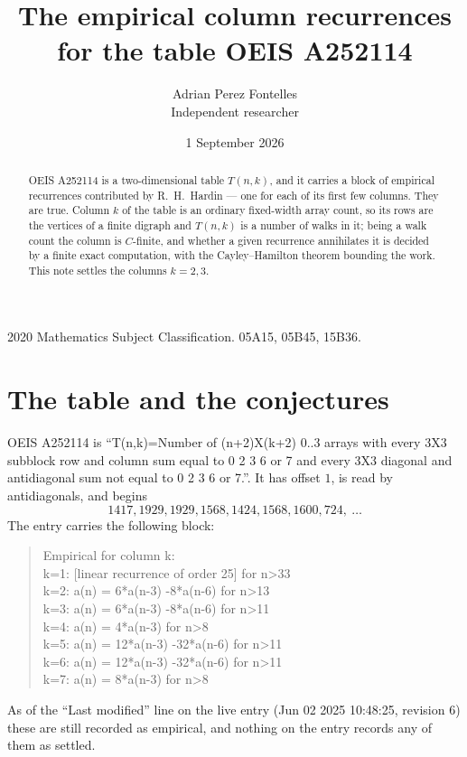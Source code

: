 \documentclass[11pt,a4paper]{article}
\title{The empirical column recurrences for the table OEIS A252114}
\author{Adrian Perez Fontelles\\ \small Independent researcher}
\date{1 September 2026}
\theoremstyle{plain}
\theoremstyle{definition}
\begin{document}
\maketitle

\begin{abstract}
OEIS A252114 is a two-dimensional table $T(n,k)$, and it carries a block of empirical
recurrences contributed by R.~H.~Hardin --- one for each of its first few columns. They are
true. Column $k$ of the table is an ordinary fixed-width array count, so its rows are the
vertices of a finite digraph and $T(n,k)$ is a number of walks in it; being a walk count the
column is $C$-finite, and whether a given recurrence annihilates it is decided by a finite
exact computation, with the Cayley--Hamilton theorem bounding the work. This note settles the columns $k=2, 3$.
\end{abstract}

\noindent\small 2020 Mathematics Subject Classification. 05A15, 05B45, 15B36.\normalsize

\section{The table and the conjectures}

OEIS A252114 is ``T(n,k)=Number of (n+2)X(k+2) 0..3 arrays with every 3X3 subblock row and column sum equal to 0 2 3 6 or 7 and every 3X3 diagonal and antidiagonal sum not equal to 0 2 3 6 or 7.''. It has offset $1$, is
read by antidiagonals, and begins
\[
1417, 1929, 1929, 1568, 1424, 1568, 1600, 724,\ \dots
\]
The entry carries the following block:
\begin{quote}\small
Empirical for column k:\\
k=1: [linear recurrence of order 25] for n>33\\
k=2: a(n) = 6*a(n-3) -8*a(n-6) for n>13\\
k=3: a(n) = 6*a(n-3) -8*a(n-6) for n>11\\
k=4: a(n) = 4*a(n-3) for n>8\\
k=5: a(n) = 12*a(n-3) -32*a(n-6) for n>11\\
k=6: a(n) = 12*a(n-3) -32*a(n-6) for n>11\\
k=7: a(n) = 8*a(n-3) for n>8\\
\end{quote}
As of the ``Last modified'' line on the live entry (Jun 02 2025 10:48:25, revision 6) these are still
recorded as empirical, and nothing on the entry records any of them as settled.
\end{document}
